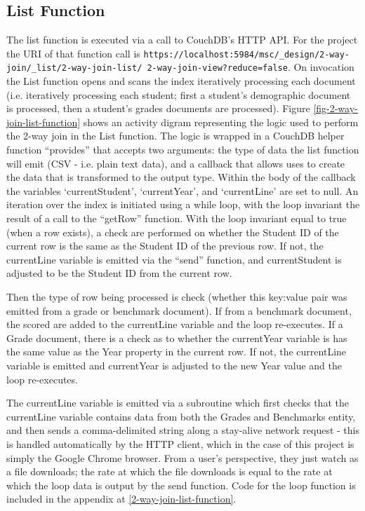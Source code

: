 \subsection{List Function}
The list function is executed via a call to CouchDB's HTTP API. For the project the URI of that function call is \texttt{https://localhost:5984/msc/\_design/2-way-join/\_list/2-way-join-list/ 2-way-join-view?reduce=false}. On invocation the List function opens and scans the index iteratively processing each document (i.e. iteratively processing each student; first a student's demographic document is processed, then a student's grades documents are processed). Figure \ref{fig-2-way-join-list-function} shows an activity digram representing the logic used to perform the 2-way join in the List function. The logic is wrapped in a CouchDB helper function ``provides'' that accepts two arguments: the type of data the list function will emit (CSV - i.e. plain text data), and a callback that allows uses to create the data that is transformed to the output type. Within the body of the callback the variables `currentStudent', `currentYear', and `currentLine' are set to null. An iteration over the index is initiated using a while loop, with the loop invariant the result of a call to the ``getRow'' function. With the loop invariant equal to true (when a row exists), a check are performed on whether the Student ID of the current row is the same as the Student ID of the previous row. If not, the currentLine variable is emitted via the ``send'' function, and currentStudent is adjusted to be the Student ID from the current row.

Then the type of row being processed is check (whether this key:value pair was emitted from a grade or benchmark document). If from a benchmark document, the scored are added to the currentLine variable and the loop re-executes. If a Grade document, there is a check as to whether the currentYear variable is has the same value as the Year property in the current row. If not, the currentLine variable is emitted and currentYear is adjusted to the new Year value and the loop re-executes.

The currentLine variable is emitted via a subroutine which first checks that the currentLine variable contains data from both the Grades and Benchmarks entity, and then sends a comma-delimited string along a stay-alive network request - this is handled automatically by the HTTP client, which in the case of this project is simply the Google Chrome browser. From a user's perspective, they just watch as a file downloads; the rate at which the file downloads is equal to the rate at which the loop data is output by the send function. Code for the loop function is included in the appendix at \ref{2-way-join-list-function}.